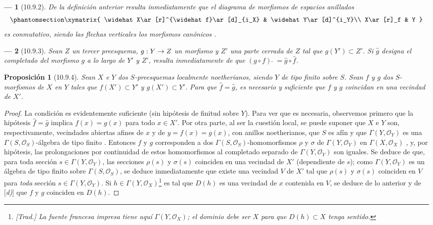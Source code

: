 \documentclass[oneside]{amsart}
\theoremstyle{ega-env-style}
\newtheorem*{env}{---}
\theoremstyle{ega-thm-env-style}
\newtheorem*{proposition}{Proposición}
\theoremstyle{ega-defn-env-style}
\def\mathcal{\mathscr}
\def\sh{\mathcal}                   %
\renewcommand{\to}{\mathchoice{\longrightarrow}{\rightarrow}{\rightarrow}{\rightarrow}}
\let\EGAOriginalLabel\label
\renewcommand{\label}[1]{\phantomsection\EGAOriginalLabel{#1}}
\begin{document}
\begin{env}[10.9.2]
\label{I.10.9.2}
De la definición anterior resulta inmediatamente que el diagrama de morfismos de espacios anillados
\[
  \label{I.10.9.2.1-fr}
  \xymatrix{
    \widehat X\ar[r]^{\widehat f}\ar[d]_{i_X} &
    \widehat Y\ar[d]^{i_Y}\\
    X\ar[r]_f &
    Y
  }
\]
es conmutativo, siendo las flechas verticales los morfismos canónicos .
\end{env}

\begin{env}[10.9.3]
\label{I.10.9.3}
Sean $Z$ un tercer preesquema, $g:Y\to Z$ un morfismo y $Z'$ una parte cerrada de $Z$ tal que $g(Y')\subset Z'$.
Si $\widehat g$ designa el completado del morfismo $g$ a lo largo de $Y'$ y $Z'$, resulta inmediatamente de  que
$(g\circ f){\,\widehat{\,}\,}=\widehat g\circ\widehat f$.
\end{env}

\begin{proposition}[10.9.4]
\label{I.10.9.4}
Sean $X$ e $Y$ dos $S$-preesquemas localmente noetherianos, siendo $Y$ de tipo finito sobre $S$.
Sean $f$ y $g$ dos $S$-morfismos de $X$ en $Y$ tales que $f(X')\subset Y'$ y $g(X')\subset Y'$.
Para que $\widehat f=\widehat g$, es necesario y suficiente que $f$ y $g$ coincidan en una vecindad de $X'$.
\end{proposition}

\begin{proof}
La condición es evidentemente suficiente (sin hipótesis de finitud sobre $Y$).
Para ver que es necesaria, observemos primero que la hipótesis $\widehat f=\widehat g$ implica $f(x)=g(x)$ para todo $x\in X'$.
Por otra parte, al ser la cuestión local, se puede suponer que $X$ e $Y$ son, respectivamente, vecindades abiertas afines de $x$ y de $y=f(x)=g(x)$, con anillos noetherianos, que $S$ es afín y que $\Gamma(Y,\mathscr{O}_Y)$ es una $\Gamma(S,\mathscr{O}_S)$-álgebra de tipo finito .
Entonces $f$ y $g$ corresponden a dos $\Gamma(S,\mathscr{O}_S)$-homomorfismos $\rho$ y $\sigma$ de $\Gamma(Y,\mathscr{O}_Y)$ en $\Gamma(X,\mathscr{O}_X)$ , y, por hipótesis, las prolongaciones por continuidad de estos homomorfismos al completado separado de $\Gamma(Y,\mathscr{O}_Y)$ son iguales.
Se deduce de  que, para toda sección $s\in\Gamma(Y,\mathscr{O}_Y)$, las secciones $\rho(s)$ y $\sigma(s)$ coinciden en una vecindad de $X'$ (dependiente de $s$); como $\Gamma(Y,\mathscr{O}_Y)$ es un álgebra de tipo finito sobre $\Gamma(S,\mathscr{O}_S)$, se deduce inmediatamente que existe una vecindad $V$ de $X'$ tal que $\rho(s)$ y $\sigma(s)$ coinciden en $V$ para \emph{toda} sección $s\in\Gamma(Y,\mathscr{O}_Y)$.
Si $h\in\Gamma(Y,\mathscr{O}_X)$\footnote{\emph{[Trad.] La fuente francesa impresa tiene aquí $\Gamma(Y,\sh{O}_X)$; el dominio debe ser $X$ para que $D(h)\subset X$ tenga sentido.}} es tal que $D(h)$ es una vecindad de $x$ contenida en $V$, se deduce de lo anterior y de [\emph{d)}] que $f$ y $g$ coinciden en $D(h)$.
\end{proof}
\end{document}

